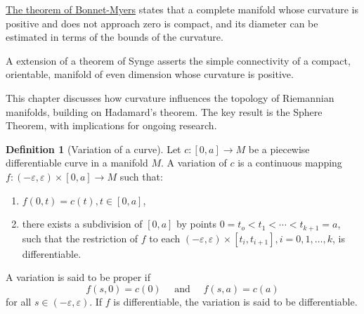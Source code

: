 \documentclass{amsart}
\theoremstyle{plain}
\theoremstyle{definition}
\newtheorem{definition}[theorem]{Definition}
\theoremstyle{remark}
\begin{document}
\underline{The theorem of Bonnet-Myers} states that a complete manifold whose curvature is positive and does not approach zero is compact, and its diameter can be estimated in terms of the bounds of the curvature.

A extension of a theorem of Synge asserts the simple connectivity of a compact, orientable, manifold of even dimension whose curvature is positive.

This chapter discusses how curvature influences the topology of Riemannian manifolds, building on Hadamard's theorem. The key result is the Sphere Theorem, with implications for ongoing research.

\begin{definition}[Variation of a curve]
Let $c:[0, a] \rightarrow M$ be a piecewise differentiable curve in a manifold $M$. A variation of $c$ is a continuous mapping $f:(-\varepsilon, \varepsilon) \times[0, a] \rightarrow M$ such that:
	\begin{enumerate}
		\item $f(0, t)=c(t), t \in[0, a]$,
		\item there exists a subdivision of $[0, a]$ by points $0=t_o<t_1<\cdots<t_{k+1}=a$, such that the restriction of $f$ to each $(-\varepsilon, \varepsilon) \times\left[t_i, t_{i+1}\right], i=0,1, \ldots, k$, is differentiable.
	\end{enumerate}
A variation is said to be proper if
\[
f(s, 0)=c(0) \quad \text { and } \quad f(s, a)=c(a)
\]for all $s \in(-\varepsilon, \varepsilon)$. If $f$ is differentiable, the variation is said to be differentiable.
\end{definition}
\end{document}
